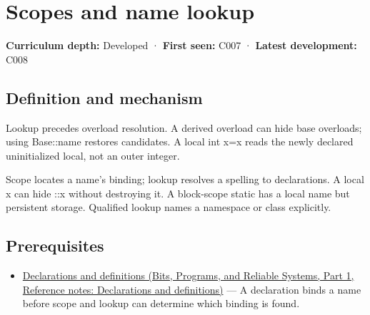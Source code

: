 \hypertarget{appendix-b12b31759da1}{}\label{referencestart:appendix-b12b31759da1}
\section{Scopes and name lookup}\label{appendix-b12b31759da1-scopes-and-name-lookup}

\hypertarget{appendix-b12b31759da1-scopes-and-name-lookup}{}

\textbf{Curriculum depth:} Developed · \textbf{First seen:} C007 · \textbf{Latest development:} C008

\begin{allmightroledefinition}

\subsection{Definition and mechanism}\label{appendix-b12b31759da1-definition-and-mechanism}

\hypertarget{appendix-b12b31759da1-definition-and-mechanism}{}

Lookup precedes overload resolution. A derived overload can hide base overloads; using Base::name restores candidates. A local int x=x reads the newly declared uninitialized local, not an outer integer.

\end{allmightroledefinition}

Scope locates a name's binding; lookup resolves a spelling to declarations. A local x can hide ::x without destroying it. A block-scope static has a local name but persistent storage. Qualified lookup names a namespace or class explicitly.

\subsection{Prerequisites}\label{appendix-b12b31759da1-prerequisites}

\hypertarget{appendix-b12b31759da1-prerequisites}{}

\begin{itemize}
\tightlist
\item
  \href{../01-Bits-Programs-and-Reliable-Systems-P01/main.pdf\#nameddest=appendix-2e4d494c2d94}{Declarations and definitions (Bits, Programs, and Reliable Systems, Part 1, Reference notes: Declarations and definitions)} --- A declaration binds a name before scope and lookup can determine which binding is found.
\end{itemize}

